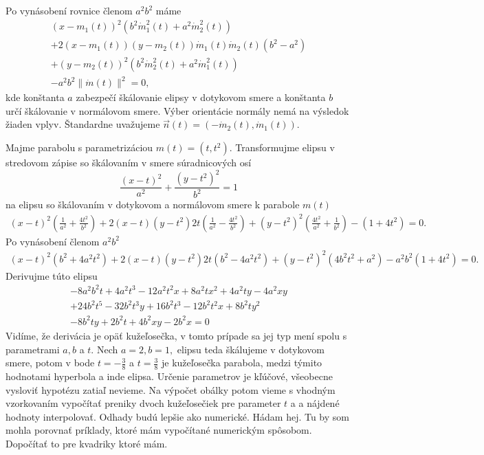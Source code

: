 Po vynásobení rovnice členom $a^2b^2$ máme
\begin{align*}
(x-m_1(t))^2(b^2 \dot{m}_1^2(t) + a^2 \dot{m}_2^2(t)) \\
+ 2(x-m_1(t))(y-m_2(t))\dot{m}_1(t)\dot{m}_2(t)(b^2-a^2) \\
+ (y-m_2(t))^2 (b^2 \dot{m}_2^2(t) + a^2 \dot{m}_1^2(t))  \\
- a^2 b^2\| \dot{m}(t) \|^2 = 0,
\end{align*}
kde konštanta $a$ zabezpečí škálovanie elipsy v dotykovom smere a konštanta $b$ určí škálovanie v normálovom smere. Výber orientácie normály nemá na výsledok žiaden vplyv. Štandardne uvažujeme $\vec{n}(t)=(-\dot{m}_2(t), \dot{m}_1(t)).$
\begin{example}[Parabola]
Majme parabolu s parametrizáciou $m(t)=(t, t^2).$ Transformujme elipsu v stredovom zápise so škálovaním v smere súradnicových osí
\begin{equation}
\frac{(x - t)^2}{{a^2}} + \frac{(y - t^2)^2}{b^2} = 1
\end{equation}
na elipsu so škálovaním v dotykovom a normálovom smere k parabole $m(t)$
\begin{align*}
(x-t)^2(\frac{1}{a^2} + \frac{4t^2}{b^2}) + 2(x-t)(y-t^2)2t(\frac{1}{a^2}-\frac{4t^2}{b^2})+(y-t^2)^2(\frac{4t^2}{a^2} + \frac{1}{b^2}) - (1+4t^2) = 0.
\end{align*}
Po vynásobení členom $a^2b^2$
\begin{align*}
(x-t)^2(b^2 + 4a^2t^2) + 2(x-t)(y-t^2)2t(b^2-4a^2t^2)+(y-t^2)^2(4b^2t^2 + a^2) - a^2b^2(1+4t^2) = 0.
\end{align*}
Derivujme túto elipsu 
\begin{align*}
-8a^{2}b^{2}t+4a^{2}t^{3}-12a^{2}t^{2}x+8a^{2}tx^{2}+4a^{2}ty-4a^{2}xy \\ +24b^{2}t^{5}-32b^{2}t^{3}y+16b^{2}t^{3}-12b^{2}t^{2}x+8b^{2} ty^{2} \\-8b^{2}ty+2b^{2}t+4b^{2}xy-2b^{2}x=0
\end{align*}
Vidíme, že derivácia je opäť kužeľosečka, v tomto prípade sa jej typ mení spolu s parametrami $a, b$ a $t$.
Nech $a = 2, b = 1, $ elipsu teda škálujeme v dotykovom smere, potom v bode $t = - \frac{3}{8}$ a $t = \frac{3}{8}$ je kužeľosečka parabola, medzi týmito hodnotami hyperbola a inde elipsa. Určenie parametrov je kľúčové, všeobecne vysloviť hypotézu zatiaľ nevieme. Na výpočet obálky potom vieme s vhodným vzorkovaním vypočítať preniky dvoch kužeľosečiek pre parameter $t$ a a nájdené hodnoty interpolovať. Odhady budú lepšie ako numerické. Hádam hej. Tu by som mohla porovnať príklady, ktoré mám vypočítané numerickým spôsobom. Dopočítať to pre kvadriky ktoré mám.
\end{example}
